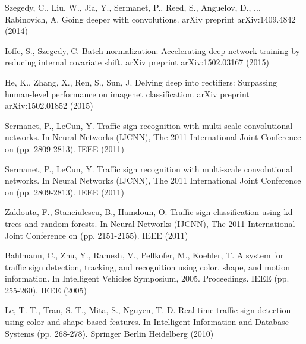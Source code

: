 \documentclass[conference]{IEEEtran}
\begin{document}
\begin{thebibliography}{1}
Szegedy, C., Liu, W., Jia, Y., Sermanet, P., Reed, S., Anguelov, D., ... Rabinovich, A. Going deeper with convolutions. arXiv preprint arXiv:1409.4842 (2014)

 Ioffe, S., Szegedy, C. Batch normalization: Accelerating deep network training by reducing internal covariate shift. arXiv preprint arXiv:1502.03167 (2015)

 He, K., Zhang, X., Ren, S., Sun, J. Delving deep into rectifiers: Surpassing human-level performance on imagenet classification. arXiv preprint arXiv:1502.01852 (2015)

 Sermanet, P., LeCun, Y. Traffic sign recognition with multi-scale convolutional networks. In Neural Networks (IJCNN), The 2011 International Joint Conference on (pp. 2809-2813). IEEE (2011)

 Sermanet, P., LeCun, Y. Traffic sign recognition with multi-scale convolutional networks. In Neural Networks (IJCNN), The 2011 International Joint Conference on (pp. 2809-2813). IEEE (2011)

 Zaklouta, F., Stanciulescu, B., Hamdoun, O. Traffic sign classification using kd trees and random forests. In Neural Networks (IJCNN), The 2011 International Joint Conference on (pp. 2151-2155). IEEE (2011)

Bahlmann, C., Zhu, Y., Ramesh, V., Pellkofer, M., Koehler, T. A system for traffic sign detection, tracking, and recognition using color, shape, and motion information. In Intelligent Vehicles Symposium, 2005. Proceedings. IEEE (pp. 255-260). IEEE (2005)

Le, T. T., Tran, S. T., Mita, S., Nguyen, T. D. Real time traffic sign detection using color and shape-based features. In Intelligent Information and Database Systems (pp. 268-278). Springer Berlin Heidelberg (2010)

\end{thebibliography}


\end{document}
